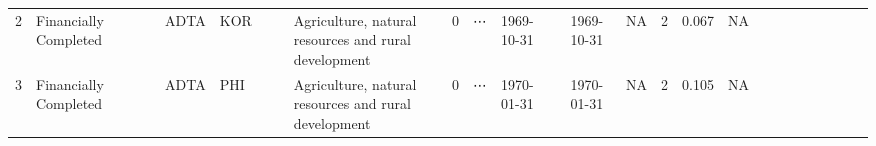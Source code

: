 \documentclass[11pt]{article}
\begin{document}
\begin{tabular}{r|lllllllllllllllllllllllll}
	    2                                                 & Financially Completed                                &                                                      &                                                      & ADTA                                                 & KOR                                                  &                                                      &                                                      & Agriculture, natural resources and rural development & 0                                                    & ⋯                                                    & 1969-10-31                                           &                                                      & 1969-10-31                                           & NA                                                   & 2                                                    & 0.067                                                & NA                                                   &                                                      &                                                      &                                                     \\
	    3                                                 & Financially Completed                                &                                                      &                                                      & ADTA                                                 & PHI                                                  &                                                      &                                                      & Agriculture, natural resources and rural development & 0                                                    & ⋯                                                    & 1970-01-31                                           &                                                      & 1970-01-31                                           & NA                                                   & 2                                                    & 0.105                                                & NA                                                   &                                                      &                                                      &                                                     \\

\end{tabular}
\end{document}
